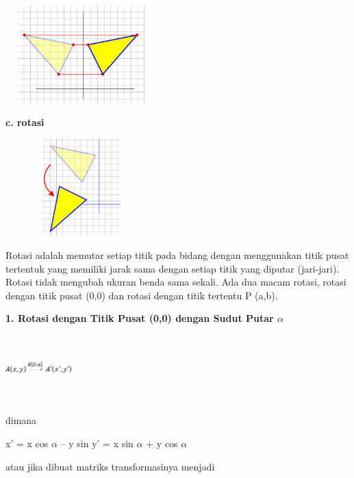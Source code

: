 \documentclass[11pt,fleqn]{book} %
\begin{document}
\begin{center}
	\noindent \includegraphics*[width=2.32in, height=1.48in, keepaspectratio=false, trim=0.00in 0.11in 0.00in 0.00in]{Pictures/4.PNG}
\end{center}

\newpage
\noindent \textbf{c. rotasi}

\begin{center}
	\noindent \includegraphics*[width=2.32in, height=1.48in, keepaspectratio=false, trim=0.00in 0.11in 0.00in 0.00in]{Pictures/5.PNG}
\end{center}
\noindent 
Rotasi adalah memutar setiap titik pada bidang dengan menggunakan titik pusat tertentuk yang memiliki jarak sama dengan setiap titik yang diputar (jari-jari). Rotasi tidak mengubah ukuran benda sama sekali. Ada dua macam rotasi, rotasi dengan titik pusat (0,0) dan rotasi dengan titik tertentu P (a,b).

\noindent \textbf{1. Rotasi dengan Titik Pusat (0,0) dengan Sudut Putar $\alpha$}
\begin{center}
	\noindent \includegraphics*[width=1.01in, height=1.01in, keepaspectratio=false, trim=0.00in 0.11in 0.00in 0.00in]{Pictures/6.PNG}
\end{center}

\noindent
dimana

\noindent x’ = x cos $\alpha$ – y sin
\noindent y’ = x sin $\alpha$ + y cos $\alpha$

atau jika dibuat matriks transformasinya menjadi
\end{document}
